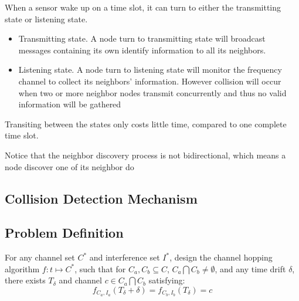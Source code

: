 When a sensor wake up on a time slot, it can turn to either the transmitting state or listening state. 
\begin{itemize}
\item Transmitting state. A node turn to transmitting state will broadcast messages containing its own identify 
information to all its neighbors.
\item  Listening state. A node turn to listening state will monitor the frequency channel to collect its neighbors' information.
However collision will occur when two or more neighbor nodes transmit concurrently and thus no valid information will be gathered
\end{itemize}
Transiting between the states only costs little time, compared to one complete time slot.


Notice that the neighbor discovery process is not bidirectional, which means a node discover one of its neighbor do







\subsection{Collision Detection Mechanism}









\subsection{Problem Definition}


\begin{problem}
For any channel set $C^*$ and interference set $I^*$, design the
channel hopping algorithm $f: t\mapsto C^*$, such that for $C_a, C_b
\subseteq C$, $C_a \bigcap C_b \neq \emptyset$, and any time drift
$\delta$, there exists $T_{\delta}$ and channel $c \in C_a \bigcap
C_b$ satisfying:
\begin{equation*}
f_{C_a, I_a}(T_{\delta}+\delta) = f_{C_b, I_b}(T_{\delta}) = c
\end{equation*}
\end{problem}




